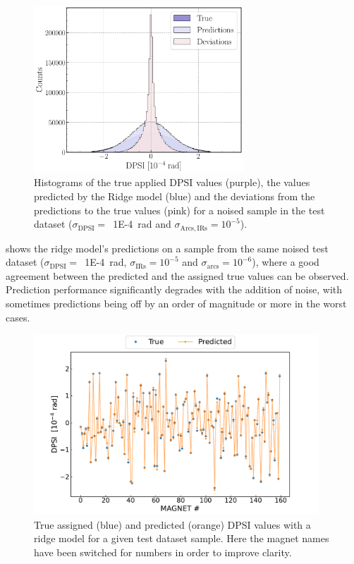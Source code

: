 \begin{figure}[!htb]
    \centering
    \includegraphics*[width=0.7\textwidth]{Figures/ML_for_IR_Coupling/ridge_histograms.pdf}
    \caption{Histograms of the true applied DPSI values (\textcolor{ridgepurple}{purple}), the values predicted by the Ridge model (\textcolor{ridgeblue}{blue}) and the deviations from the predictions to the true values (\textcolor{ridgesalmon}{pink}) for a noised sample in the test dataset (\(\sigma_{\mathrm{DPSI}} =\)~\qty{1E-4}{\radian} and \(\sigma_{\mathrm{Arcs, IRs}} = 10^{-5}\)).}
    \label{figure:ridge_histograms}
\end{figure}

 shows the ridge model's predictions on a sample from the same noised test dataset (\(\sigma_{\mathrm{DPSI}} =\)~\qty{1E-4}{\radian}, \(\sigma_{\mathrm{IRs}} = 10^{-5}\) and \(\sigma_{\mathrm{arcs}} = 10^{-6}\)), where a good agreement between the predicted and the assigned true values can be observed.
Prediction performance significantly degrades with the addition of noise, with sometimes predictions being off by an order of magnitude or more in the worst cases.

\begin{figure}[!htb]
    \centering
    \includegraphics*[width=0.95\textwidth]{Figures/ML_for_IR_Coupling/ml_ridge_regression_sample_predictions.pdf}
    \caption{True assigned (\textcolor{mplblue}{blue}) and predicted (\textcolor{mplorange}{orange}) DPSI values with a ridge model for a given test dataset sample. Here the magnet names have been switched for numbers in order to improve clarity.}
    \label{figure:ridge_predictions}
\end{figure}


